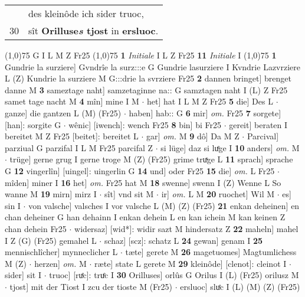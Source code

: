 \documentclass[8pt,a4paper,notitlepage]{article}
\begin{document}
\begin{table}[ht]
\begin{minipage}[t]{0.5\linewidth}
\begin{tabular}{rl}
 & des kleinôde ich sider truoc,\\ 
30 & sît \textbf{Orilluse\textit{s} tjost} in \textbf{ersluoc}.\\ 
\end{tabular}
\scriptsize
\line(1,0){75} \newline
G I L M Z Fr25 \newline
\line(1,0){75} \newline
\textbf{1} \textit{Initiale} I L Z Fr25  \textbf{11} \textit{Initiale} I  \newline
\line(1,0){75} \newline
\textbf{1} Gundrie la surziere] Gvndrîe la surz:::e G Gundrie lasurziere I Kvndrie Lazvrziere L (Z) Kundrie la surziere M G:::drie la svrziere Fr25 \textbf{2} dannen bringet] brenget danne M \textbf{3} sameztage naht] samzetaginne na:: G samztagen naht I (L) Z Fr25 samet tage nacht M \textbf{4} mîn] mine I M  $\cdot$ het] hat I L M Z Fr25 \textbf{5} die] Des L  $\cdot$ ganze] die gantzen L (M) (Fr25)  $\cdot$ haben] hab:: G \textbf{6} mir] \textit{om.} Fr25 \textbf{7} sorgete] [han]: sorgite G  $\cdot$ wênic] [iwench]: wench Fr25 \textbf{8} bin] bi Fr25  $\cdot$ gereit] beraten I bereitet M Z Fr25 [beitet]: bereitet L  $\cdot$ gar] \textit{om.} M \textbf{9} dô] Da M Z  $\cdot$ Parcival] parziual G parzifal I L M Fr25 parcifal Z  $\cdot$ si lüge] daz si luͤge I \textbf{10} anders] \textit{om.} M  $\cdot$ trüge] gerne grug I gerne troge M (Z) (Fr25) grime truͯge L \textbf{11} sprach] sprache G \textbf{12} vingerlîn] [uingel]: uingerlin G \textbf{14} und] oder Fr25 \textbf{15} die] \textit{om.} L Fr25  $\cdot$ mîden] miner I \textbf{16} het] \textit{om.} Fr25 hat M \textbf{18} swenne] swenn I (Z) Wenne L So wanne M \textbf{19} mirn] mirz I  $\cdot$ sît] vnd sit M  $\cdot$ ir] \textit{om.} L M \textbf{20} ruochet] Wil M  $\cdot$ es] sin I  $\cdot$ von valsche] valsches I vor valsche L (M) (Z) (Fr25) \textbf{21} enkan deheinen] en chan deheiner G han dehainn I enkan dehein L en kan ichein M kan keinen Z chan dehein Fr25  $\cdot$ widersaz] [wid*]: widir sazt M hindersatz Z \textbf{22} maheln] mahel I Z (G) (Fr25) gemahel L  $\cdot$ schaz] [scz]: schatz L \textbf{24} gewan] genam I \textbf{25} mennischlîcher] mynneclicher L  $\cdot$ tæte] gerete M \textbf{26} magetuomes] Magtumlichess M (Z)  $\cdot$ herzen] \textit{om.} M  $\cdot$ ræte] state L gerete M \textbf{29} kleinôde] [clenot]: cleinot I  $\cdot$ sider] sit I  $\cdot$ truoc] [ruͤc]: truͤc I \textbf{30} Orilluses] orlûs G Orilus I (L) (Fr25) orilusz M  $\cdot$ tjost] mit der Tiost I zcu der tioste M (Fr25)  $\cdot$ ersluoc] sluͤc I (L) (M) (Z) (Fr25) \newline

\end{minipage}
\end{table}
\end{document}
